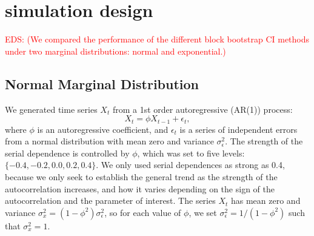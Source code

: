 \documentclass[10pt]{article}
\newcommand{\eds}[1]{\textcolor{red}{EDS: (#1)}}
\begin{document}
\section*{simulation design}
\label{sec:simdes}


\eds{We compared the performance of the different block bootstrap CI methods 
under two marginal distributions: normal and exponential.} 

\subsection*{Normal Marginal Distribution}
We generated time series $X_t$ from a 1st 
order autoregressive (AR(1)) process:
\begin{equation*}
X_t = \phi X_{t-1} + \epsilon_t,
\end{equation*}
where $\phi$ is an autoregressive coefficient, and $\epsilon_t$ is a series of
independent errors from a normal distribution with mean zero and variance
$\sigma_{\epsilon}^2$. The strength of the serial dependence is controlled by
$\phi$, which was set to five levels: $\{-0.4, -0.2, 0.0, 0.2, 0.4\}$. We only
used serial dependences as strong as 0.4, because we only seek to 
establish the 
general trend as the strength of the autocorrelation 
increases, and how it varies depending on the sign of the autocorrelation and 
the parameter of interest. The 
series $X_t$ has mean zero and variance 
$\sigma_x^2 = (1 - \phi^2) \sigma_{\epsilon}^2$, so for each value of $\phi$, we 
set $\sigma_{\epsilon}^2 = 1 / (1 - \phi^2)$ such that $\sigma_x^2 = 1$.
\end{document}
